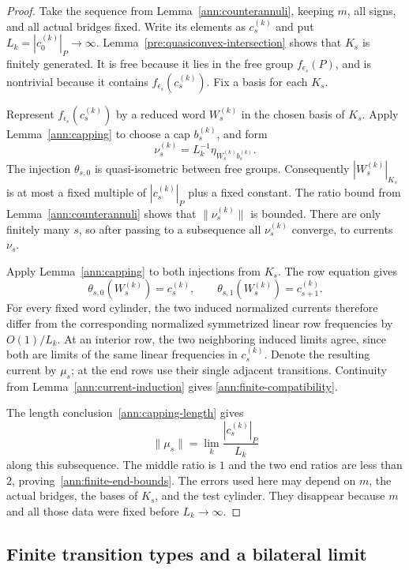 \begin{proof}
Take the sequence from Lemma~\ref{ann:counterannuli}, keeping $m$,
all signs, and all actual bridges fixed.  Write its elements as
$c_s^{(k)}$ and put $L_k=|c_0^{(k)}|_P\to\infty$.
Lemma~\ref{pre:quasiconvex-intersection} shows that $K_s$ is finitely
generated.  It is free because it lies in the free group
$f_{\epsilon_s}(P)$, and is nontrivial because it contains
$f_{\epsilon_s}(c_s^{(k)})$.  Fix a basis for each $K_s$.

Represent $f_{\epsilon_s}(c_s^{(k)})$ by a reduced word $W_s^{(k)}$
in the chosen basis of $K_s$.  Apply Lemma~\ref{ann:capping} to
choose a cap $b_s^{(k)}$, and form
\[
 \nu_s^{(k)}=L_k^{-1}\eta_{W_s^{(k)}b_s^{(k)}}.
\]
The injection $\theta_{s,0}$ is quasi-isometric between free groups.
Consequently $|W_s^{(k)}|_{K_s}$ is at most a fixed multiple of
$|c_s^{(k)}|_P$ plus a fixed constant.  The ratio bound from
Lemma~\ref{ann:counterannuli} shows that $\|\nu_s^{(k)}\|$ is
bounded.  There are only finitely many $s$, so after passing to a
subsequence all $\nu_s^{(k)}$ converge, to currents $\nu_s$.

Apply Lemma~\ref{ann:capping} to both injections from $K_s$.  The row
equation gives
\[
 \theta_{s,0}(W_s^{(k)})=c_s^{(k)},\qquad
 \theta_{s,1}(W_s^{(k)})=c_{s+1}^{(k)}.
\]
For every fixed word cylinder, the two induced normalized currents
therefore differ from the corresponding normalized symmetrized
linear row frequencies by $O(1)/L_k$.  At an interior row, the two
neighboring induced limits agree, since both are limits of the same
linear frequencies in $c_s^{(k)}$.  Denote the resulting current by
$\mu_s$; at the end rows use their single adjacent transitions.
Continuity from Lemma~\ref{ann:current-induction} gives
\eqref{ann:finite-compatibility}.

The length conclusion~\eqref{ann:capping-length} gives
\[
 \|\mu_s\|=\lim_k\frac{|c_s^{(k)}|_P}{L_k}
\]
along this subsequence.  The middle ratio is $1$ and the two end
ratios are less than $2$, proving~\eqref{ann:finite-end-bounds}.
The errors used here may depend on $m$, the actual bridges, the
bases of $K_s$, and the test cylinder.  They disappear because
$m$ and all those data were fixed before $L_k\to\infty$.
\end{proof}

\subsection{Finite transition types and a bilateral limit}

